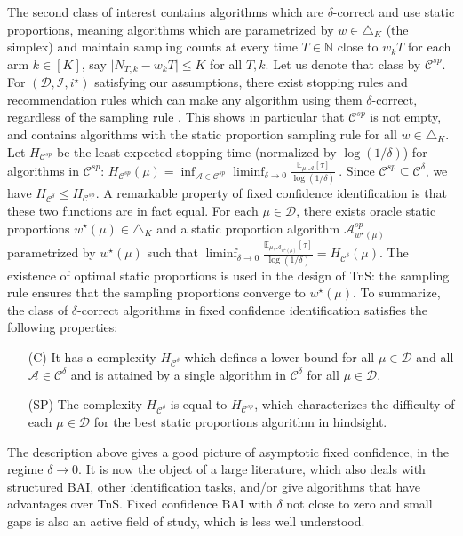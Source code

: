 \documentclass{article}
\begin{document}
The second class of interest contains algorithms which are $\delta$-correct and use static proportions, meaning algorithms which are parametrized by $w \in \triangle_K$ (the simplex) and maintain sampling counts at every time $T \in \mathbb{N}$ close to $w_k T$ for each arm $k \in [K]$, say $\vert N_{T,k} - w_k T \vert \le K$ for all $T,k$. Let us denote that class by $\mathcal C^{sp}$.
For $(\mathcal D, \mathcal I, i^\star)$ satisfying our assumptions, there exist stopping rules and recommendation rules which can make any algorithm using them $\delta$-correct, regardless of the sampling rule \cite{garivier2016optimal}. This shows in particular that $\mathcal C^{sp}$ is not empty, and contains algorithms with the static proportion sampling rule for all $w \in \triangle_K$.
Let $H_{\mathcal C^{sp}}$ be the least expected stopping time (normalized by $\log(1/\delta)$) for algorithms in $\mathcal C^{sp}$:
$
H_{\mathcal C^{sp}}(\mu) = \inf_{\mathcal A \in \mathcal C^{sp}} \liminf_{\delta \to 0} \frac{\mathbb{E}_{\mu, \mathcal A}[\tau]}{\log(1/\delta)}
\: .
$
Since $\mathcal C^{sp} \subseteq \mathcal C^\delta$, we have $H_{\mathcal C^\delta} \le H_{\mathcal C^{sp}}$. A remarkable property of fixed confidence identification is that these two functions are in fact equal. For each $\mu \in \mathcal D$, there exists oracle static proportions $w^\star(\mu) \in \triangle_K$ and a static proportion algorithm $\mathcal A_{w^\star(\mu)}^{sp}$ parametrized by $w^\star(\mu)$ such that $\liminf_{\delta \to 0} \frac{\mathbb{E}_{\mu, \mathcal A_{w^\star(\mu)}}[\tau]}{\log(1/\delta)} = H_{\mathcal C^\delta}(\mu)$.
The existence of optimal static proportions is used in the design of TnS: the sampling rule ensures that the sampling proportions converge to $w^\star(\mu)$.
To summarize, the class of $\delta$-correct algorithms in fixed confidence identification satisfies the following properties:
\begin{itemize}
	\item [(C)] It has a complexity $H_{\mathcal C^\delta}$ which defines a lower bound for all $\mu \in \mathcal D$ and all $\mathcal A \in \mathcal C^\delta$ and is attained by a single algorithm in $\mathcal C^\delta$ for all $\mu \in \mathcal D$.
	\item [(SP)] The complexity $H_{\mathcal C^\delta}$ is equal to $H_{\mathcal C^{sp}}$, which characterizes the difficulty of each $\mu \in \mathcal D$ for the best static proportions algorithm in hindsight.
\end{itemize}


The description above gives a good picture of asymptotic fixed confidence, in the regime $\delta \to 0$. It is now the object of a large literature, which also deals with structured BAI, other identification tasks, and/or give algorithms that have advantages over TnS.
Fixed confidence BAI with $\delta$ not close to zero and small gaps is also an active field of study, which is less well understood.
\end{document}
